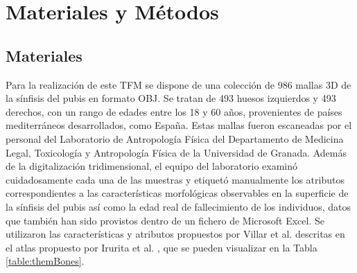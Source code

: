 \chapter{Materiales y Métodos}

\section{Materiales}
\label{section4:materials}
Para la realización de este TFM se dispone de una colección de 986 mallas 3D de la sínfisis del pubis en formato OBJ. Se tratan de 493 huesos izquierdos y 493 derechos, con un rango de edades entre los 18 y 60 años, provenientes de países mediterráneos desarrollados, como España. Estas mallas fueron escaneadas por el personal del Laboratorio de Antropología Física del Departamento de Medicina Legal, Toxicología y Antropología Física de la Universidad de Granada. Además de la digitalización tridimensional, el equipo del laboratorio examinó cuidadosamente cada una de las muestras y etiquetó manualmente los atributos correspondientes a las características morfológicas observables en la superficie de la sínfisis del pubis así como la edad real de fallecimiento de los individuos, datos que también han sido provistos dentro de un fichero de Microsoft Excel. Se utilizaron las características y atributos propuestos por Villar et al. \cite{villar2017first} descritas en el atlas propuesto por Irurita et al. \cite{irurita2025pubic}, que se pueden visualizar en la Tabla \ref{table:themBones}.


